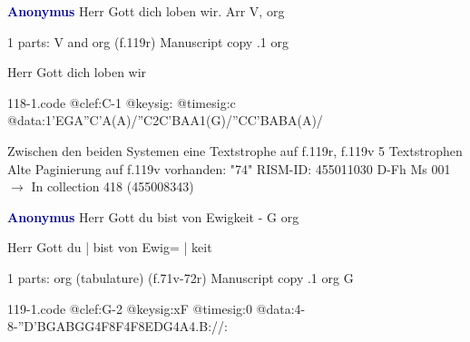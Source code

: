 \documentclass[twocolumn]{book}
\begin{document}
\newline \par \vspace{7pt} \textcolor{darkblue}{\textbf{Anonymus  }}
\newline Herr Gott dich loben wir. Arr
\newline V, org
\newline \begin{itshape}\end{itshape} 
\newline \textcolor{darkblue}{}  1 parts: V and org  (f.119r)
\newline Manuscript copy
.1  org
\newline \begin{footnotesize} Herr Gott dich loben wir \end{footnotesize}  
\begin{filecontents*}{118-1.code}
@clef:C-1
@keysig:
@timesig:c
@data:1'EGA''C'A(A)/''C2C'BAA1(G)/''CC'BABA(A)/
\end{filecontents*}
\newline
%

\newline Zwischen den beiden Systemen eine Textstrophe auf f.119r, f.119v 5 Textstrophen
\newline Alte Paginierung auf f.119v vorhanden: "74"
\newline RISM-ID: 455011030
\newline D-Fh  Ms 001
\newline $\rightarrow$ In collection 418 (455008343)
      
\newline \par \vspace{7pt} \textcolor{darkblue}{\textbf{Anonymus  }}
\newline Herr Gott du bist von Ewigkeit - G
\newline org
\newline \begin{itshape}[f.71v, at left:] Herr Gott du | bist von Ewig= | keit\end{itshape} 
\newline \textcolor{darkblue}{}  1 parts: org (tabulature)  (f.71v-72r)
\newline Manuscript copy
.1  org  G  
\begin{filecontents*}{119-1.code}
@clef:G-2
@keysig:xF
@timesig:0
@data:4-8-''D{'BGAB}{GG}4F8F4F8E{DG}4A4.B://:
\end{filecontents*}
\newline
%
\end{document}
